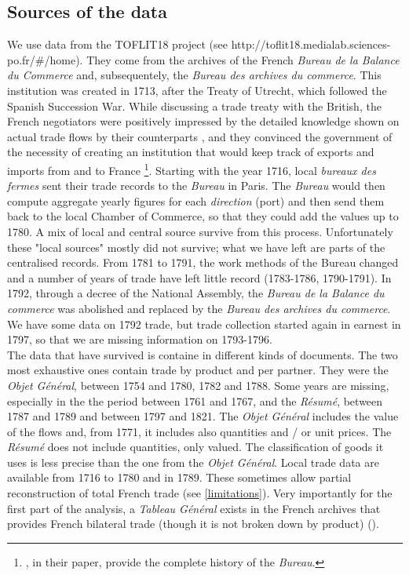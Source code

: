 \documentclass[12pt,a4paper,notitlepage,english]{article}
\begin{document}
\subsection{Sources of the data} \label{sources_of_data}
We use data from the TOFLIT18 project (see http://toflit18.medialab.sciences-po.fr/\#/home). They come from the archives of the French \textit{Bureau de la Balance du Commerce} and, subsequentely, the \textit{Bureau des archives du commerce}.
This institution was created in 1713, after the Treaty of Utrecht, which followed the Spanish Succession War.
While discussing a trade treaty with the British, the French negotiators were positively impressed by the detailed knowledge shown on actual trade flows by their counterparts , and they convinced the government of the necessity of creating an institution that would keep track of exports and imports from and to France \citep{charles2011collecte}\footnote{\cite{charles2011collecte}, in their paper, provide the complete history of the \textit{Bureau}.}.
Starting with the year 1716, local \textit{bureaux des fermes} sent their trade records to the \textit{Bureau} in Paris.
The \textit{Bureau} would then compute aggregate yearly figures for each \textit{direction} (port) and then send them back to the local Chamber of Commerce, so that they could add the values up to 1780.
A mix of local and central source survive from this process. Unfortunately these "local sources" mostly did not survive; what we have left are parts of the centralised records.
From 1781 to 1791, the work methods of the Bureau changed and a number of years of trade have left little record (1783-1786, 1790-1791). In 1792, through a decree of the National Assembly, the \textit{Bureau de la Balance du commerce} was abolished and replaced by the \textit{Bureau des archives du commerce}. We have some data on 1792 trade, but trade collection started again in earnest in 1797, so that we are missing information on 1793-1796.\\
The data that have survived is containe in different kinds of documents.
The two most exhaustive ones contain trade by product and per partner. They were the \textit{Objet Général}, between 1754 and 1780, 1782 and 1788. Some years are missing, especially in the the period between 1761 and 1767, and the \textit{Résumé}, between 1787 and 1789 and between 1797 and 1821.
The \textit{Objet Général }includes the value of the flows and, from 1771, it includes also quantities and / or unit prices.
The \textit{Résumé} does not include quantities, only valued. The classification of goods it uses is less precise than the one from the \textit{Objet Général}.
Local trade data are available from 1716 to 1780 and in 1789. These sometimes allow partial reconstruction of total French trade (see \ref{limitations}).
Very importantly for the first part of the analysis, a \textit{Tableau Général} exists in the French archives that provides French bilateral trade (though it is not broken down by product) (\cite{RomanoDocumentiPrimeConsiderazioni1957}).
\end{document}
